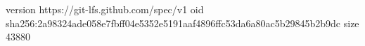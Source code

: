 version https://git-lfs.github.com/spec/v1
oid sha256:2a98324ade058e7fbff04e5352e5191aaf4896ffc53da6a80ac5b29845b2b9dc
size 43880
